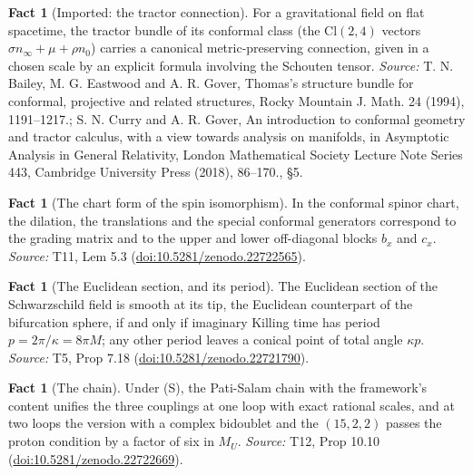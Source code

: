 \documentclass[11pt]{article}
\theoremstyle{definition}
\newtheorem{fact}[theorem]{Fact}
\theoremstyle{plain}
\providecommand{\Cl}{}\renewcommand{\Cl}{\mathrm{Cl}}
\providecommand{\nInf}{}\renewcommand{\nInf}{n_\infty}
\providecommand{\nO}{}\renewcommand{\nO}{n_0}
\begin{document}
\begin{fact}[Imported: the tractor connection]\label{c:interior.imported-tractor-connection}
For a gravitational field on flat spacetime, the tractor bundle of its conformal class (the $\Cl(2,4)$ vectors $\sigma\nInf + \mu + \rho\nO$) carries a canonical metric-preserving connection, given in a chosen scale by an explicit formula involving the Schouten tensor.
\emph{Source:} T. N. Bailey, M. G. Eastwood and A. R. Gover, Thomas's structure bundle for conformal, projective and related structures, Rocky Mountain J. Math. 24 (1994), 1191--1217.; S. N. Curry and A. R. Gover, An introduction to conformal geometry and tractor calculus, with a view towards analysis on manifolds, in Asymptotic Analysis in General Relativity, London Mathematical Society Lecture Note Series 443, Cambridge University Press (2018), 86--170., \S 5.
\end{fact}

\begin{fact}[The chart form of the spin isomorphism]\label{c:mass.chart-form-spin-isomorphism}
In the conformal spinor chart, the dilation, the translations and the special conformal generators correspond to the grading matrix and to the upper and lower off-diagonal blocks $b_x$ and $c_x$.
\emph{Source:} T11, Lem 5.3 (\href{https://doi.org/10.5281/zenodo.22722565}{doi:10.5281/zenodo.22722565}).
\end{fact}

\begin{fact}[The Euclidean section, and its period]\label{c:singularity.euclidean-section-period}
The Euclidean section of the Schwarzschild field is smooth at its tip, the Euclidean counterpart of the bifurcation sphere, if and only if imaginary Killing time has period $p = 2\pi/\kappa = 8\pi M$; any other period leaves a conical point of total angle $\kappa p$.
\emph{Source:} T5, Prop 7.18 (\href{https://doi.org/10.5281/zenodo.22721790}{doi:10.5281/zenodo.22721790}).
\end{fact}

\begin{fact}[The chain]\label{c:standard-model.chain}
Under (S), the Pati-Salam chain with the framework's content unifies the three couplings at one loop with exact rational scales, and at two loops the version with a complex bidoublet and the $(15,2,2)$ passes the proton condition by a factor of six in $M_{U}$.
\emph{Source:} T12, Prop 10.10 (\href{https://doi.org/10.5281/zenodo.22722669}{doi:10.5281/zenodo.22722669}).
\end{fact}
\end{document}
